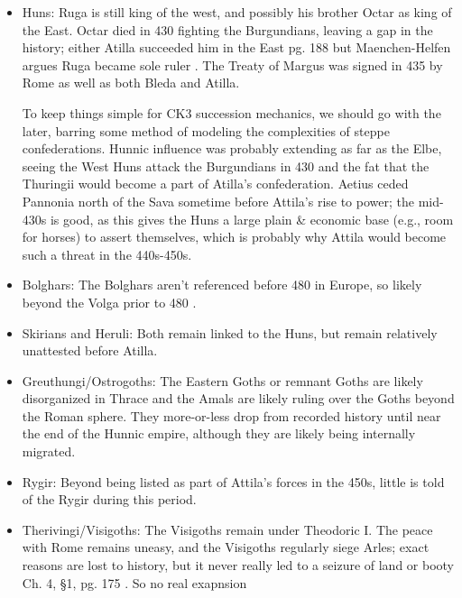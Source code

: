 \documentclass{article}
\newcommand{\specificCite}[1]{\tiny #1 \normalsize}
\begin{document}
	\begin{itemize}
		\item Huns:\newline
		Ruga is still king of the west, and possibly his brother Octar as king of the East.
		Octar died in 430 fighting the Burgundians, leaving a gap in the history; either Atilla succeeded him in the East \cite{CambridgeHistoryEarlyInnerAsia} \specificCite{pg. 188} but Maenchen-Helfen argues Ruga became sole ruler \cite{OttoHuns}.
		The Treaty of Margus was signed in 435 by Rome as well as both Bleda and Atilla.
		
		To keep things simple for CK3 succession mechanics, we should go with the later, barring some method of modeling the complexities of steppe confederations.
		Hunnic influence was probably extending as far as the Elbe, seeing the West Huns attack the Burgundians in 430 and the fat that the Thuringii would become a part of Atilla's confederation.
		Aetius ceded Pannonia north of the Sava sometime before Attila's rise to power; the mid-430s is good, as this gives the Huns a large plain \& economic base (e.g., room for horses) to assert themselves, which is probably why Attila would become such a threat in the 440s-450s.
		
		\item Bolghars:\newline
		The Bolghars aren't referenced before 480 in Europe, so likely beyond the Volga prior to 480 \cite{KimHuns}.
		
		\item Skirians and Heruli:\newline
		Both remain linked to the Huns, but remain relatively unattested before Atilla.
		
		\item Greuthungi/Ostrogoths:\newline
		The Eastern Goths or remnant Goths are likely disorganized in Thrace and the Amals are likely ruling over the Goths beyond the Roman sphere.
		They more-or-less drop from recorded history until near the end of the Hunnic empire, although they are likely being internally migrated.
		
		\item Rygir:\newline
		Beyond being listed as part of Attila's forces in the 450s, little is told of the Rygir during this period.
		
		\item Therivingi/Visigoths:\newline
		The Visigoths remain under Theodoric I.
		The peace with Rome remains uneasy, and the Visigoths regularly siege Arles; exact reasons are lost to history, but it never really led to a seizure of land or booty \cite{WolframHistoryOfTheGoths}\specificCite{Ch. 4, §1, pg. 175}.
		So no real exapnsion
		

\end{itemize}
\end{document}
